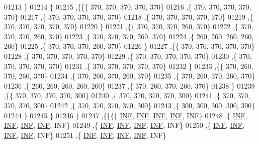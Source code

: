 \begin{DoxyCode}
01213    \}
01214   \}
01215  ,\{\{\{   370,   370,   370,   370,   370\}
01216    ,\{   370,   370,   370,   370,   370\}
01217    ,\{   370,   370,   370,   370,   370\}
01218    ,\{   370,   370,   370,   370,   370\}
01219    ,\{   370,   370,   370,   370,   370\}
01220    \}
01221   ,\{\{   370,   370,   370,   260,   370\}
01222    ,\{   370,   370,   370,   260,   370\}
01223    ,\{   370,   370,   370,   260,   370\}
01224    ,\{   260,   260,   260,   260,   260\}
01225    ,\{   370,   370,   370,   260,   370\}
01226    \}
01227   ,\{\{   370,   370,   370,   370,   370\}
01228    ,\{   370,   370,   370,   370,   370\}
01229    ,\{   370,   370,   370,   370,   370\}
01230    ,\{   370,   370,   370,   370,   370\}
01231    ,\{   370,   370,   370,   370,   370\}
01232    \}
01233   ,\{\{   370,   260,   370,   260,   370\}
01234    ,\{   370,   260,   370,   260,   370\}
01235    ,\{   370,   260,   370,   260,   370\}
01236    ,\{   260,   260,   260,   260,   260\}
01237    ,\{   370,   260,   370,   260,   370\}
01238    \}
01239   ,\{\{   370,   370,   370,   370,   300\}
01240    ,\{   370,   370,   370,   370,   300\}
01241    ,\{   370,   370,   370,   370,   300\}
01242    ,\{   370,   370,   370,   370,   300\}
01243    ,\{   300,   300,   300,   300,   300\}
01244    \}
01245   \}
01246  \}
01247 ,\{\{\{\{   \hyperlink{energy__const_8h_a12c2040f25d8e3a7b9e1c2024c618cb6}{INF},   \hyperlink{energy__const_8h_a12c2040f25d8e3a7b9e1c2024c618cb6}{INF},   \hyperlink{energy__const_8h_a12c2040f25d8e3a7b9e1c2024c618cb6}{INF},   \hyperlink{energy__const_8h_a12c2040f25d8e3a7b9e1c2024c618cb6}{INF},   INF\}
01248    ,\{   \hyperlink{energy__const_8h_a12c2040f25d8e3a7b9e1c2024c618cb6}{INF},   \hyperlink{energy__const_8h_a12c2040f25d8e3a7b9e1c2024c618cb6}{INF},   \hyperlink{energy__const_8h_a12c2040f25d8e3a7b9e1c2024c618cb6}{INF},   \hyperlink{energy__const_8h_a12c2040f25d8e3a7b9e1c2024c618cb6}{INF},   INF\}
01249    ,\{   \hyperlink{energy__const_8h_a12c2040f25d8e3a7b9e1c2024c618cb6}{INF},   \hyperlink{energy__const_8h_a12c2040f25d8e3a7b9e1c2024c618cb6}{INF},   \hyperlink{energy__const_8h_a12c2040f25d8e3a7b9e1c2024c618cb6}{INF},   \hyperlink{energy__const_8h_a12c2040f25d8e3a7b9e1c2024c618cb6}{INF},   INF\}
01250    ,\{   \hyperlink{energy__const_8h_a12c2040f25d8e3a7b9e1c2024c618cb6}{INF},   \hyperlink{energy__const_8h_a12c2040f25d8e3a7b9e1c2024c618cb6}{INF},   \hyperlink{energy__const_8h_a12c2040f25d8e3a7b9e1c2024c618cb6}{INF},   \hyperlink{energy__const_8h_a12c2040f25d8e3a7b9e1c2024c618cb6}{INF},   INF\}
01251    ,\{   \hyperlink{energy__const_8h_a12c2040f25d8e3a7b9e1c2024c618cb6}{INF},   \hyperlink{energy__const_8h_a12c2040f25d8e3a7b9e1c2024c618cb6}{INF},   \hyperlink{energy__const_8h_a12c2040f25d8e3a7b9e1c2024c618cb6}{INF},   \hyperlink{energy__const_8h_a12c2040f25d8e3a7b9e1c2024c618cb6}{INF},   INF\}

\end{DoxyCode}
